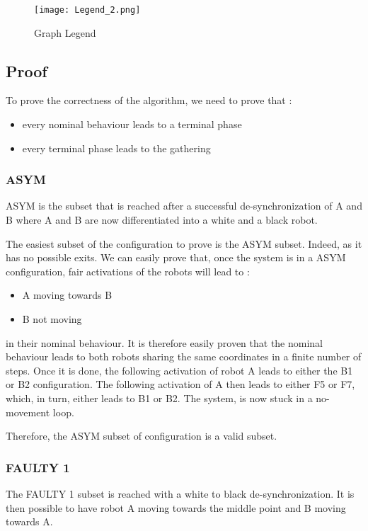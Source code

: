 \documentclass[11pt]{article}
\begin{document}
\begin{figure}[htb]
	\centering
	\texttt{[image: Legend\_2.png]}
	\caption{Graph Legend}
\end{figure}
\pagebreak

\subsection{Proof}

To prove the correctness of the algorithm, we need to prove that : 
\begin{itemize}
\item every nominal behaviour leads to a terminal phase
\item every terminal phase leads to the gathering
\end{itemize}

\subsubsection{ASYM}

ASYM is the subset that is reached after a successful de-synchronization of A and B where A and B are now differentiated into a white and a black robot.

The easiest subset of the configuration to prove is the ASYM subset. Indeed, as it has no possible exits. We can easily prove that, once the system is in a ASYM configuration, fair activations of the robots will lead to :

\begin{itemize}
\item A moving towards B
\item B not moving
\end{itemize}

in their nominal behaviour.
It is therefore easily proven that the nominal behaviour leads to both robots sharing the same coordinates in a finite number of steps.
Once it is done, the following activation of robot A leads to either the B1 or B2 configuration. The following activation of A then leads to either F5 or F7, which, in turn, either leads to B1 or B2. The system, is now stuck in a no-movement loop.

Therefore, the ASYM subset of configuration is a valid subset.

\subsubsection{FAULTY 1}
The FAULTY 1 subset is reached with a white to black de-synchronization.
It is then possible to have robot A moving towards the middle point and B moving towards A.
\end{document}
